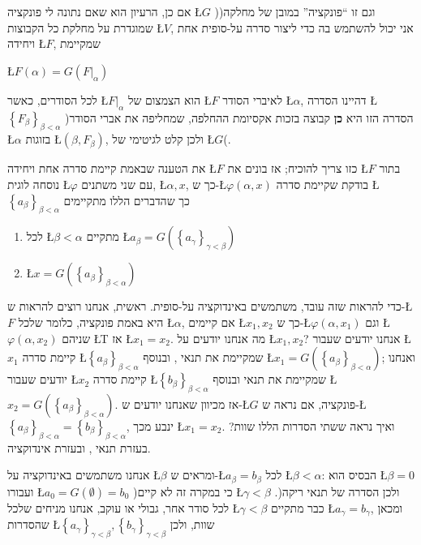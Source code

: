 \documentclass[english,hebrew]{article}
\begin{document}
אם כן, הרעיון הוא שאם נתונה לי פונקציה \L{$G$} )וגם זו \textquotedblleft פונקציה\textquotedblright{}
במובן של מחלקה( שמוגדרת על מחלקת כל הקבוצות \L{$V$}, אני יכול להשתמש
בה כדי ליצור סדרה על-סופית אחת ויחידה \L{$F$}, שמקיימת

\L{$F\left(\alpha\right)=G\left(F|_{\alpha}\right)$}

לכל הסודרים, כאשר \L{$F|_{\alpha}$} הוא הצמצום של \L{$F$} לאיברי
הסודר \L{$\alpha$}, דהיינו הסדרה \L{$\left\{ F_{\beta}\right\} _{\beta<\alpha}$}
)הסדרה הזו היא \textbf{כן} קבוצה בזכות אקסיומת ההחלפה, שמחליפה את
אברי הסודר \L{$\alpha$} בזוגות \L{$\left(\beta,F_{\beta}\right)$},
ולכן קלט לגיטימי של \L{$G$}(.

את הטענה שבאמת קיימת סדרה אחת ויחידה \L{$F$} כזו צריך להוכיח; אז
בונים את \L{$F$} בתור נוסחה לוגית \L{$\varphi$} עם שני משתנים, \L{$\alpha,x$},
כך ש-\L{$\varphi\left(\alpha,x\right)$} בודקת שקיימת סדרה \L{$\left\{ a_{\beta}\right\} _{\beta<\alpha}$}
כך שהדברים הללו מתקיימים
\begin{enumerate}
\item לכל \L{$\beta<\alpha$} מתקיים \L{$a_{\beta}=G\left(\left\{ a_{\gamma}\right\} _{\gamma<\beta}\right)$}
\item \L{$x=G\left(\left\{ a_{\beta}\right\} _{\beta<\alpha}\right)$}
\end{enumerate}
כדי להראות שזה עובד, משתמשים באינדוקציה על-סופית. ראשית, אנחנו רוצים
להראות ש-\L{$F$} היא באמת פונקציה, כלומר שלכל \L{$\alpha$}, אם קיימים
\L{$x_{1},x_{2}$} כך ש-\L{$\varphi\left(\alpha,x_{1}\right)$} וגם
\L{$\varphi\left(\alpha,x_{2}\right)$} שניהם \L{T} אז \L{$x_{1}=x_{2}$}.
מה אנחנו יודעים על \L{$x_{1},x_{2}$}? אנחנו יודעים שעבור \L{$x_{1}$}
קיימת סדרה \L{$\left\{ a_{\beta}\right\} _{\beta<\alpha}$} שמקיימת
את תנאי {\endL}, ובנוסף \L{$x_{1}=G\left(\left\{ a_{\beta}\right\} _{\beta<\alpha}\right)$};
ואנחנו יודעים שעבור \L{$x_{2}$} קיימת סדרה \L{$\left\{ b_{\beta}\right\} _{\beta<\alpha}$}
שמקיימת את תנאי {\endL} ובנוסף \L{$x_{2}=G\left(\left\{ a_{\beta}\right\} _{\beta<\alpha}\right)$}.
אז מכיוון שאנחנו יודעים ש-\L{$G$} פונקציה, אם נראה ש-\L{$\left\{ a_{\beta}\right\} _{\beta<\alpha}=\left\{ b_{\beta}\right\} _{\beta<\alpha}$},
ינבע מכך \L{$x_{1}=x_{2}$}. ואיך נראה ששתי הסדרות הללו שוות? בעזרת
תנאי {\endL}, ובעזרת אינדוקציה.

אנחנו משתמשים באינדוקציה על \L{$\beta$} ומראים ש-\L{$a_{\beta}=b_{\beta}$}
לכל \L{$\beta<\alpha$}: הבסיס הוא \L{$\beta=0$} ועבורו \L{$a_{0}=G\left(\emptyset\right)=b_{0}$}
)כי במקרה זה לא קיים \L{$\gamma<\beta$} ולכן הסדרה של תנאי {\endL}
ריקה(. לכל סודר אחר, גבולי או עוקב, אנחנו מניחים שלכל \L{$\gamma<\beta$}
כבר מתקיים \L{$a_{\gamma}=b_{\gamma}$}, ומכאן שהסדרות \L{$\left\{ a_{\gamma}\right\} _{\gamma<\beta},\left\{ b_{\gamma}\right\} _{\gamma<\beta}$}
שוות, ולכן 
\end{document}
